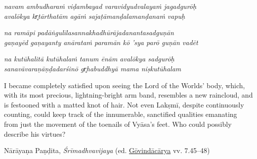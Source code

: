 \begin{pullquote}\raggedright
      \emph{navam ambudharaṁ viḍambayad varavidyudvalayaṁ jagadgurōḥ}\\
\emph{avalōkya kr̥tārthatām agāṁ sajaṭāmanḍalamanḍanaṁ vapuḥ}

\emph{na ramāpi padāṅgulīlasannakhadhūrājadanantasadguṇān}\\
\emph{gaṇayēd gaṇayanty anārataṁ paramān kō ’sya parō guṇān vadēt}

\emph{na kutūhalitā kutūhalaṁ tanum ēnām avalōkya sadgurōḥ}\\
\emph{sanavāvaraṇāṇḍadarśinō gr̥habuddhyā mama niṣkutūhalam}
\end{pullquote}
      
\begin{pullquote}
I became completely satisfied upon seeing the Lord of the Worlds’ body, which, with its most precious, lightning-bright arm band, resembles a new raincloud, and is festooned with a matted knot of hair. Not even Lakṣmī, despite continuously counting, could keep track of the innumerable, sanctified qualities emanating from just the movement of the toenails of Vyāsa’s feet. Who could possibly describe his virtues?


\medskip\hfill\begin{minipage}{0.9\textwidth}\small\hfill
Nārāyaṇa Paṇḍita, \emph{{Śrīmadhvavijaya}} (ed. \hyperref[NarayanaPandita2017]{Gōvindācārya} vv. 7.45–48)\end{minipage}\hspace{2em}
\end{pullquote}

